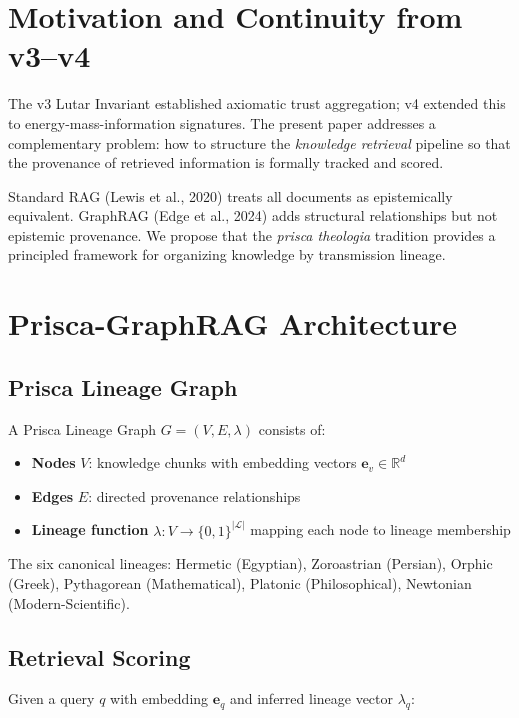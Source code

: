 \documentclass[11pt]{article}
\theoremstyle{plain}
\begin{document}
\section{Motivation and Continuity from v3–v4}

The v3 Lutar Invariant established axiomatic trust aggregation; v4 extended this to energy-mass-information signatures. The present paper addresses a complementary problem: how to structure the \emph{knowledge retrieval} pipeline so that the provenance of retrieved information is formally tracked and scored.

Standard RAG (Lewis et al., 2020) treats all documents as epistemically equivalent. GraphRAG (Edge et al., 2024) adds structural relationships but not epistemic provenance. We propose that the \emph{prisca theologia} tradition provides a principled framework for organizing knowledge by transmission lineage.


\section{Prisca-GraphRAG Architecture}

\subsection{Prisca Lineage Graph}

A Prisca Lineage Graph \( G = (V, E, \lambda) \) consists of:

\begin{itemize}
  \item \textbf{Nodes} \( V \): knowledge chunks with embedding vectors \( \mathbf{e}_v \in \mathbb{R}^d \)
  \item \textbf{Edges} \( E \): directed provenance relationships
  \item \textbf{Lineage function} \( \lambda: V \to \{0,1\}^{|\mathcal{L}|} \) mapping each node to lineage membership
\end{itemize}

The six canonical lineages: Hermetic (Egyptian), Zoroastrian (Persian), Orphic (Greek), Pythagorean (Mathematical), Platonic (Philosophical), Newtonian (Modern-Scientific).

\subsection{Retrieval Scoring}

Given a query \( q \) with embedding \( \mathbf{e}_q \) and inferred lineage vector \( \lambda_q \):
\end{document}
